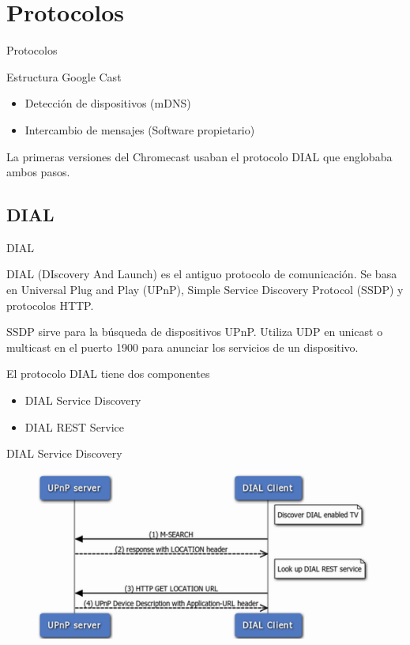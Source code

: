\section{Protocolos}

\begin{frame}{Protocolos}
	\begin{block}{Estructura Google Cast}
		\begin{itemize}
			\item Detección de dispositivos (mDNS)
			\item Intercambio de mensajes (Software propietario)
		\end{itemize}
	\end{block}
	
	\begin{block}{ }
		La primeras versiones del Chromecast usaban el protocolo DIAL que englobaba ambos pasos.		
	\end{block}
\end{frame}


\subsection{DIAL}
\begin{frame}{DIAL}
	\begin{block}{ }
		DIAL (DIscovery And Launch) es el antiguo protocolo de comunicación. 
		Se basa en Universal Plug and Play (UPnP), Simple Service Discovery Protocol (SSDP) y protocolos HTTP.
		 
		SSDP sirve para la búsqueda de dispositivos UPnP. 
		Utiliza UDP en unicast o multicast en el puerto 1900 para anunciar los servicios de un dispositivo.
	\end{block}
	
	\begin{block}{ }
		El protocolo DIAL tiene dos componentes
		\begin{itemize}
			\item DIAL Service Discovery
			\item DIAL REST Service
		\end{itemize}
	\end{block}
\end{frame}



\begin{frame}{DIAL Service Discovery}
	\begin{figure}[H]
		\centering
		\includegraphics[width=1\textwidth]{./Imagenes/dial.png}
		\label{fig:DIAL}
	\end{figure}
\end{frame}

